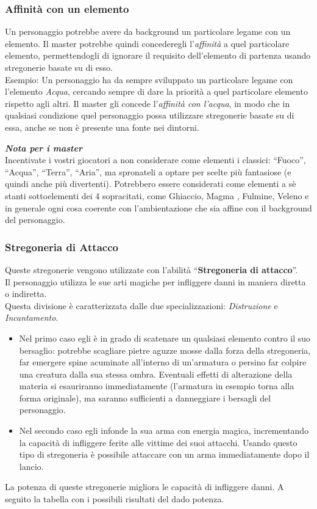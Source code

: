 \documentclass[../manuale_main.tex]{subfiles}
\begin{document}
\subsubsection{Affinità con un elemento}
Un personaggio potrebbe avere da background un particolare legame con un elemento. Il master potrebbe quindi concederegli l'\emph{affinità} a quel particolare elemento, permettendogli di ignorare il requisito dell'elemento di partenza usando stregonerie basate su di esso.\\
Esempio: Un personaggio ha da sempre sviluppato un particolare legame con l'elemento \emph{Acqua}, cercando sempre di dare la priorità a quel particolare elemento rispetto agli altri. Il master gli concede l'\emph{affinità con l'acqua}, in modo che in qualsiasi condizione quel personaggio possa utilizzare stregonerie basate su di essa, anche se non è presente una fonte nei dintorni.
\begin{framed}
\textbf{\textit{Nota per i master}}\\
Incentivate i vostri giocatori a non considerare come elementi i classici: ``Fuoco'', ``Acqua'', ``Terra'', ``Aria'', ma spronateli a optare per scelte più fantasiose (e quindi anche più divertenti). Potrebbero essere considerati come elementi a sè stanti sottoelementi dei 4 sopracitati, come Ghiaccio, Magma , Fulmine, Veleno e in generale ogni cosa coerente con l'ambientazione che sia affine con il background del personaggio.
\end{framed}
\clearpage
\subsubsection{Stregoneria di Attacco}
Queste stregonerie vengono utilizzate con l'abilità ``\textbf{Stregoneria di attacco}''.\\
Il personaggio utilizza le sue arti magiche per infliggere danni in maniera diretta o indiretta. \\
Questa divisione è caratterizzata dalle due specializzazioni: \emph{Distruzione} e \emph{Incantamento}.\\
\begin{itemize}
\item Nel primo caso egli è in grado di scatenare un qualsiasi elemento contro il suo bersaglio: potrebbe scagliare pietre aguzze mosse dalla forza della stregoneria, far emergere spine acuminate all'interno di un'armatura o persino far colpire una creatura dalla sua stessa ombra. Eventuali effetti di alterazione della materia si esauriranno immediatamente (l'armatura in esempio torna alla forma originale), ma saranno sufficienti a danneggiare i bersagli del personaggio.
\item Nel secondo caso egli infonde la sua arma con energia magica, incrementando la capacità di infliggere ferite alle vittime dei suoi attacchi. Usando questo tipo di stregoneria è possibile attaccare con un arma immediatamente dopo il lancio.
\end{itemize}
La potenza di queste stregonerie migliora le capacità di infliggere danni. A seguito la tabella con i possibili risultati del dado potenza.\\
\end{document}
